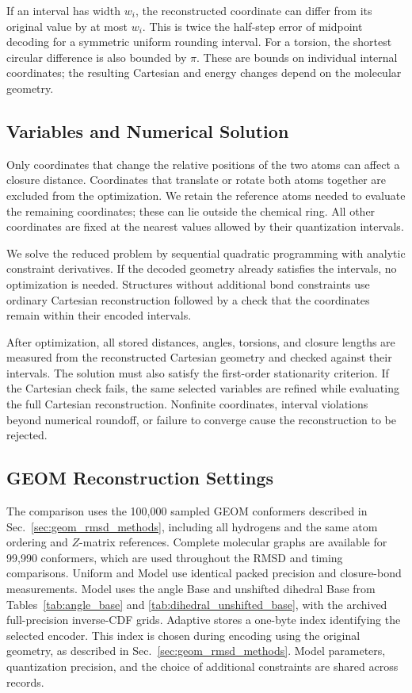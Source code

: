 \documentclass[%
 preprint,
superscriptaddress,
 amsmath,amssymb,
 aip,
 jcp,
]{revtex4-2}
\begin{document}
If an interval has width $w_i$, the reconstructed coordinate can differ from its original value by at most $w_i$.
This is twice the half-step error of midpoint decoding for a symmetric uniform rounding interval.
For a torsion, the shortest circular difference is also bounded by $\pi$.
These are bounds on individual internal coordinates; the resulting Cartesian and energy changes depend on the molecular geometry.

\subsection{Variables and Numerical Solution}

Only coordinates that change the relative positions of the two atoms can affect a closure distance.
Coordinates that translate or rotate both atoms together are excluded from the optimization.
We retain the reference atoms needed to evaluate the remaining coordinates; these can lie outside the chemical ring.
All other coordinates are fixed at the nearest values allowed by their quantization intervals.

We solve the reduced problem by sequential quadratic programming with analytic constraint derivatives.
If the decoded geometry already satisfies the intervals, no optimization is needed.
Structures without additional bond constraints use ordinary Cartesian reconstruction followed by a check that the coordinates remain within their encoded intervals.

After optimization, all stored distances, angles, torsions, and closure lengths are measured from the reconstructed Cartesian geometry and checked against their intervals.
The solution must also satisfy the first-order stationarity criterion.
If the Cartesian check fails, the same selected variables are refined while evaluating the full Cartesian reconstruction.
Nonfinite coordinates, interval violations beyond numerical roundoff, or failure to converge cause the reconstruction to be rejected.

\subsection{GEOM Reconstruction Settings}

The comparison uses the 100,000 sampled GEOM conformers described in Sec.~\ref{sec:geom_rmsd_methods}, including all hydrogens and the same atom ordering and $Z$-matrix references.
Complete molecular graphs are available for 99,990 conformers, which are used throughout the RMSD and timing comparisons.
Uniform and Model use identical packed precision and closure-bond measurements.
Model uses the angle Base and unshifted dihedral Base from Tables~\ref{tab:angle_base} and \ref{tab:dihedral_unshifted_base}, with the archived full-precision inverse-CDF grids.
Adaptive stores a one-byte index identifying the selected encoder.
This index is chosen during encoding using the original geometry, as described in Sec.~\ref{sec:geom_rmsd_methods}.
Model parameters, quantization precision, and the choice of additional constraints are shared across records.
\end{document}
